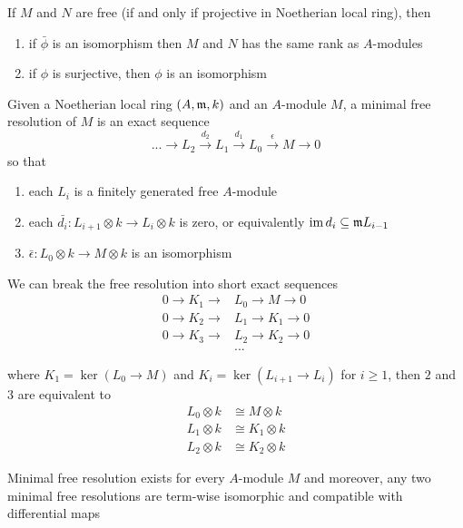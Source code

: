 If $M$ and $N$ are free (if and only if projective in Noetherian local ring), then 
\begin{enumerate}
	\item if $\bar{\phi}$ is an isomorphism then $M$ and $N$ has the same rank as $A$-modules
	\item if $\phi$ is surjective, then $\phi$ is an isomorphism
\end{enumerate}

\begin{definition}
	Given a Noetherian local ring $(A, \mathfrak{m}, k)$ and an $A$-module $M$, a minimal free resolution of $M$ is an exact sequence
	$$
		... \to L_2 \xrightarrow{d_2} L_1 \xrightarrow{d_1} L_0 \xrightarrow{\epsilon} M \to 0
	$$
	so that
	\begin{enumerate}
		\item each $L_i$ is a finitely generated free $A$-module
		\item each $\bar{d_i}: L_{i+1} \otimes k \to L_i \otimes k$ is zero, or equivalently $\operatorname{im} d_i \subseteq \mathfrak{m} L_{i-1}$
		\item $\bar{\epsilon}: L_0 \otimes k \to M \otimes k$ is an isomorphism
	\end{enumerate}
\end{definition}

\begin{remark}
	We can break the free resolution into short exact sequences
	\begin{align*}
		0 \to K_1 \to &L_0 \to M \to 0 \\
		0 \to K_2 \to &L_1 \to K_1 \to 0 \\
		0 \to K_3 \to &L_2 \to K_2 \to 0 \\
		&...
	\end{align*}
	
	where $K_1 = \ker (L_0 \to M)$ and $K_i = \ker (L_{i+1} \to L_i)$ for $i \geq 1$, then $2$ and $3$ are equivalent to 
	\begin{align*}
		L_0 \otimes k &\cong M \otimes k \\
		L_1 \otimes k &\cong K_1 \otimes k \\
		L_2 \otimes k &\cong K_2 \otimes k
	\end{align*}
\end{remark}

\begin{remark}
	Minimal free resolution exists for every $A$-module $M$ and moreover, any two minimal free resolutions are term-wise isomorphic and compatible with differential maps
\end{remark}


